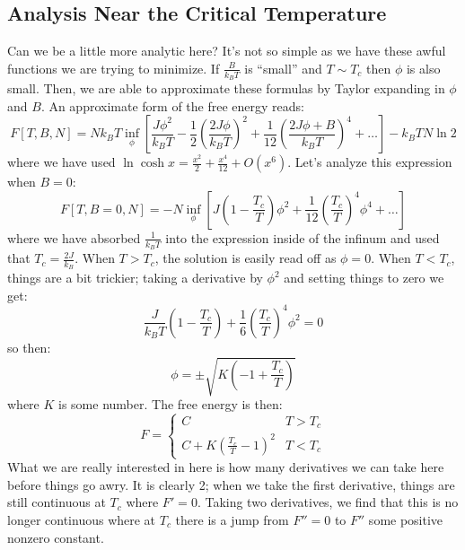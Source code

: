 \subsection{Analysis Near the Critical Temperature}
Can we be a little more analytic here? It's not so simple as we have these awful functions we are trying to minimize. If $\frac{B}{k_B T}$ is ``small'' and $T \sim T_c$ then $\phi$ is also small. Then, we are able to approximate these formulas by Taylor expanding in $\phi$ and $B$. An approximate form of the free energy reads:
\begin{equation}
    F[T, B, N] = Nk_B T \inf_\phi \left[\frac{J\phi^2}{k_B T} - \frac{1}{2}\left(\frac{2J\phi}{k_B T}\right)^2 + \frac{1}{12}\left(\frac{2J\phi + B}{k_B T}\right)^4 + \ldots \right] - k_B T N \ln 2 
\end{equation}
where we have used $\ln\cosh x = \frac{x^2}{2} + \frac{x^4}{12} + O(x^6)$. Let's analyze this expression when $B = 0$:
\begin{equation}
    F[T, B = 0, N] = -N\inf_\phi \left[J\left(1 - \frac{T_c}{T}\right)\phi^2 + \frac{1}{12}\left(\frac{T_c}{T}\right)^4\phi^4 + \ldots \right]
\end{equation}
where we have absorbed $\frac{1}{k_B T}$ into the expression inside of the infinum and used that $T_c = \frac{2J}{k_B}$.
When $T > T_c$, the solution is easily read off as $\phi = 0$. When $T < T_c$, things are a bit trickier; taking a derivative by $\phi^2$ and setting things to zero we get:
\begin{equation}
    \frac{J}{k_B T}\left(1 - \frac{T_c}{T}\right) + \frac{1}{6}\left(\frac{T_c}{T}\right)^4 \phi^2 = 0
\end{equation}
so then:
\begin{equation}
    \phi = \pm \sqrt{K\left(-1 + \frac{T_c}{T}\right)}
\end{equation}
where $K$ is some number. The free energy is then:
\begin{equation}
    F = \begin{cases}
        C & T > T_c
        \\ C + K\left(\frac{T_c}{T} - 1\right)^2 & T < T_c
    \end{cases}
\end{equation}
What we are really interested in here is how many derivatives we can take here before things go awry. It is clearly 2; when we take the first derivative, things are still continuous at $T_c$ where $F' = 0$. Taking two derivatives, we find that this is no longer continuous where at $T_c$ there is a jump from $F'' = 0$ to $F''$ some positive nonzero constant.

